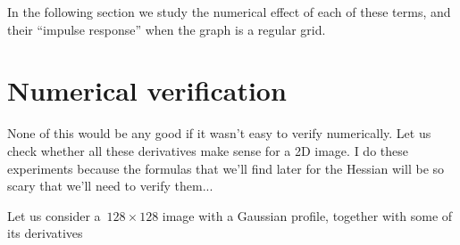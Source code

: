 In the following section we study the numerical effect of each of these
terms, and their ``impulse response'' when the graph is a regular grid.

\clearpage
\section{Numerical verification}

None of this would be any good if it wasn't easy to verify numerically.  Let
us check whether all these derivatives make sense for a 2D image.  I do these
experiments because the formulas that we'll find later for the Hessian will
be so scary that we'll need to verify them...

Let us consider a~$128\times128$ image with a Gaussian profile, together with
some of its derivatives


